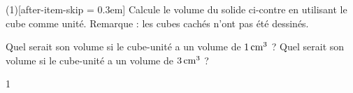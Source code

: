 \documentclass[a4paper,11pt]{report}
\begin{document}
\begin{exo}{
		\begin{minipage}[t]{0.6\textwidth}{
		\vspace{0pt}	
\begin{tasks}(1)[after-item-skip = 0.3em]
    \task Calcule le volume du solide ci-contre en utilisant le cube comme unité. Remarque : les cubes cachés n'ont pas été dessinés. 
\end{tasks}
		}
		\end{minipage}
		\begin{minipage}[t]{0.4\textwidth}{
		\vspace{0pt}
\begin{center}
\end{center}

		}
		\end{minipage}
		\begin{tasks}[after-item-skip = 0.3em]
			\task[b)] Quel serait son volume si le cube-unité a un volume de $\tunit{1}{\centi m^3}$ ?
			\task[c)] Quel serait son volume si le cube-unité a un volume de $\tunit{3}{\centi m^3}$ ?
\end{tasks}
}{1}
\end{exo}
\end{document}
